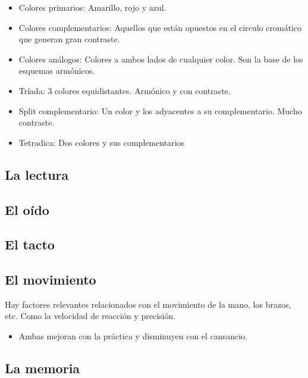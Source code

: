 \documentclass[12pt, twoside, openright]{report} %
\begin{document}
\begin{itemize}
\begin{itemize}
          \begin{itemize}
          
          \item
            Colores primarios: Amarillo, rojo y azul.
          \item
            Colores complementarios: Aquellos que están opuestos en el
            circulo cromático que generan gran contraste.
          \item
            Colores análogos: Colores a ambos lados de cualquier color.
            Son la base de los esquemas armónicos.
          \item
            Tríada: 3 colores equidistantes. Armónico y con contraste.
          \item
            Split complementario: Un color y los adyacentes a su
            complementario. Mucho contraste.
          \item
            Tetradica: Dos colores y sus complementarios
          \end{itemize}
        \end{itemize}
      \end{itemize}
\subsection{La lectura}
\subsection{El oído}
\subsection{El tacto}
\subsection{El movimiento}
Hay factores relevantes relacionados con el
      movimiento de la mano, los brazos, etc. Como la velocidad de
      reacción y precisión.

      \begin{itemize}
      
      \item
        Ambas mejoran con la práctica y disminuyen con el cansancio.
      \end{itemize}
\subsection{La memoria}
\end{document}

